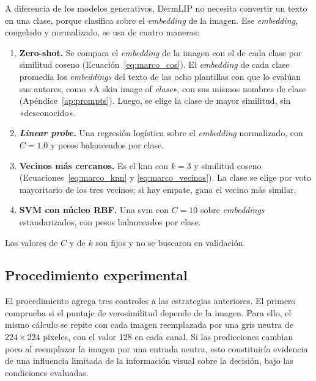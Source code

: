 \label{sec:met_dermlip}
A diferencia de los modelos generativos, DermLIP no necesita convertir un texto en una clase, porque clasifica sobre
el \emph{embedding} de la imagen. Ese \emph{embedding}, congelado y normalizado, se usa de cuatro maneras:
\begin{enumerate}[leftmargin=1.6em]
  \item \textbf{Zero-shot.} Se compara el \emph{embedding} de la imagen con el de cada clase por similitud coseno
  (Ecuación~\ref{eq:marco_cos}). El \emph{embedding} de cada clase promedia los \emph{embeddings} del texto de las
  ocho plantillas con que lo evalúan sus autores, como «A skin image of \emph{clase}», con sus mismos nombres de clase
  (Apéndice~\ref{ap:prompts}). Luego, se elige la clase de mayor similitud, sin «desconocido».
  \item \textbf{\emph{Linear probe}.} Una regresión logística sobre el \emph{embedding} normalizado, con $C = 1.0$ y pesos
  balanceados por clase.
  \item \textbf{Vecinos más cercanos.} Es el \gls{knn} con $k = 3$ y similitud coseno (Ecuaciones~\ref{eq:marco_knn} y
  \ref{eq:marco_vecinos}). La clase se elige por voto mayoritario de los tres vecinos; si hay empate, gana el vecino
  más similar.
  \item \textbf{SVM con núcleo RBF.} Una \gls{svm} con $C = 10$ sobre \emph{embeddings} estandarizados, con pesos balanceados
  por clase.
\end{enumerate}
Los valores de $C$ y de $k$ son fijos y no se buscaron en validación.

\subsection{Procedimiento experimental}
\label{sec:met_vlm_procedimiento}

El procedimiento agrega tres controles a las estrategias anteriores. El primero comprueba si el puntaje de verosimilitud
depende de la imagen. Para ello, el mismo cálculo se repite con cada imagen reemplazada por una gris neutra de
$224 \times 224$ píxeles, con el valor 128 en cada canal. Si las predicciones cambian poco al reemplazar la imagen por una entrada neutra, esto constituiría evidencia de una influencia limitada de la información visual sobre la decisión, bajo las condiciones evaluadas.

